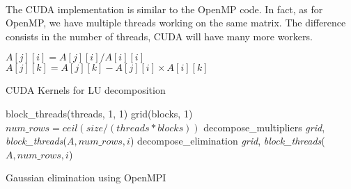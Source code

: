 \paragraph{}
The CUDA implementation is similar to the OpenMP code. In fact, as for OpenMP, we have multiple threads working on the same matrix. The difference consists in the number of threads, CUDA will have many more workers.


\begin{algorithm}[H]
\begin{algorithmic}
		\State $A[j][i] = A[j][i] / A[i][i]$ 
	\EndFor
\EndProcedure
\\
			\State $A[j][k] = A[j][k] - A[j][i] \times A[i][k]$ 
		\EndFor	
	\EndFor
\EndProcedure

\end{algorithmic}
\caption{CUDA Kernels for LU decomposition}
\label{alg:cuda_kernels}
\end{algorithm}


\begin{algorithm}[H]
\begin{algorithmic}
	\State block\_threads(threads, 1, 1)
	\State grid(blocks, 1)
	\State $num\_rows = ceil(size / (threads * blocks))$ 
	\State decompose\_multipliers  \guilsinglleft \guilsinglleft \guilsinglleft \textit{grid}, \textit{block\_threads}\guilsinglright \guilsinglright \guilsinglright ($A, num\_rows, i$)
		\State decompose\_elimination  \guilsinglleft \guilsinglleft \guilsinglleft \textit{grid}, \textit{block\_threads}\guilsinglright \guilsinglright \guilsinglright ($A, num\_rows, i$)
\EndFor
\end{algorithmic}
\caption{Gaussian elimination using OpenMPI}
\label{alg:cuda_code}
\end{algorithm}


